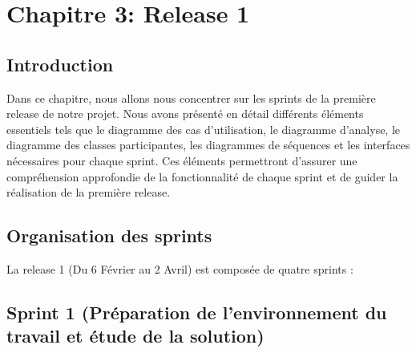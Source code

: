 \chapter*{Chapitre 3: Release 1}
\label{chap:release1}
\setcounter{part}{0}
\setcounter{chapter}{0}
\setcounter{section}{0}
\renewcommand{\thechapter}{\arabic{chapter}}
\renewcommand{\thepart}{\arabic{part}}
\renewcommand{\thesection}{\arabic{section}}
\section*{Introduction}
Dans ce chapitre, nous allons nous concentrer sur les sprints de la première release de notre projet. Nous avons présenté en détail différents éléments essentiels tels que le diagramme des cas d'utilisation, le diagramme d'analyse, le diagramme des classes participantes, les diagrammes de séquences et les interfaces nécessaires pour chaque sprint. Ces éléments permettront d'assurer une compréhension approfondie de la fonctionnalité de chaque sprint et de guider la réalisation de la première release.

\section{Organisation des sprints}
La release 1 (Du 6 Février au 2 Avril) est composée de quatre sprints : 




\section{Sprint 1 (Préparation de l'environnement du travail et étude de la solution)}

